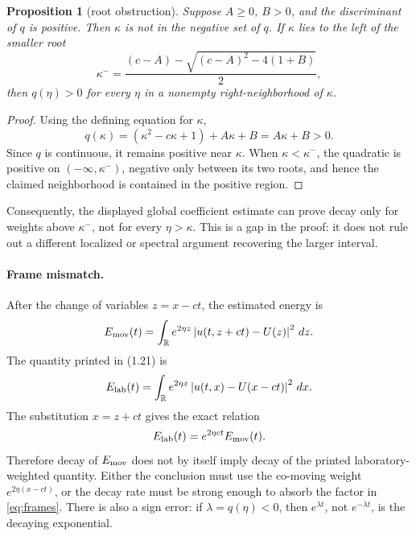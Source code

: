 \documentclass[11pt]{article}
\newcommand{\R}{\mathbb{R}}
\newcommand{\abs}[1]{\left\lvert #1\right\rvert}
\newtheorem{proposition}{Proposition}
\begin{document}
\begin{proposition}[root obstruction]
Suppose \(A\ge0\), \(B>0\), and the discriminant of \(q\) is positive.  Then
\(\kappa\) is not in the negative set of \(q\).  If \(\kappa\) lies to the
left of the smaller root
\[
  \kappa^-=\frac{(c-A)-\sqrt{(c-A)^2-4(1+B)}}2,
\]
then \(q(\eta)>0\) for every \(\eta\) in a nonempty right-neighborhood of
\(\kappa\).
\end{proposition}

\begin{proof}
Using the defining equation for \(\kappa\),
\[
 q(\kappa)
 =(\kappa^2-c\kappa+1)+A\kappa+B
 =A\kappa+B>0.
\]
Since \(q\) is continuous, it remains positive near \(\kappa\).  When
\(\kappa<\kappa^-\), the quadratic is positive on
\((-\infty,\kappa^-)\), negative only between its two roots, and hence the
claimed neighborhood is contained in the positive region.
\end{proof}

Consequently, the displayed global coefficient estimate can prove decay only
for weights above \(\kappa^-\), not for every \(\eta>\kappa\).  This is a
gap in the proof: it does not rule out a different localized or spectral
argument recovering the larger interval.

\paragraph{Frame mismatch.}
After the change of variables \(z=x-ct\), the estimated energy is
\[
 E_{\rm mov}(t)=
 \int_\R e^{2\eta z}\abs{u(t,z+ct)-U(z)}^2\,dz.
\]
The quantity printed in (1.21) is
\[
 E_{\rm lab}(t)=
 \int_\R e^{2\eta x}\abs{u(t,x)-U(x-ct)}^2\,dx.
\]
The substitution \(x=z+ct\) gives the exact relation
\begin{equation}
 E_{\rm lab}(t)=e^{2\eta ct}E_{\rm mov}(t).             \label{eq:frames}
\end{equation}
Therefore decay of \(E_{\rm mov}\) does not by itself imply decay of the
printed laboratory-weighted quantity.  Either the conclusion must use the
co-moving weight \(e^{2\eta(x-ct)}\), or the decay rate must be strong enough
to absorb the factor in \eqref{eq:frames}.  There is also a sign error:
if \(\lambda=q(\eta)<0\), then \(e^{\lambda t}\), not \(e^{-\lambda t}\),
is the decaying exponential.
\end{document}
